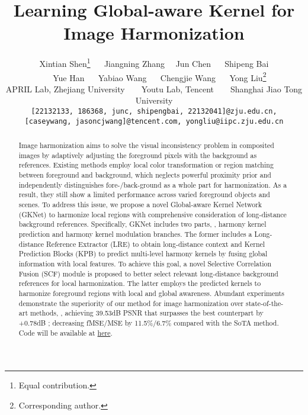 \documentclass[10pt,twocolumn,letterpaper]{article}
\begin{document}
\title{Learning Global-aware Kernel for Image Harmonization}
\author{Xintian Shen\thanks{Equal contribution.}
~ ~Jiangning Zhang\footnotemark[1]
~ ~Jun Chen
~ ~Shipeng Bai \\
~ ~Yue Han
~ ~Yabiao Wang
~ ~Chengjie Wang
~ ~Yong Liu\thanks{Corresponding author.} \\
\normalsize  APRIL Lab, Zhejiang University ~ ~ Youtu Lab, Tencent ~ ~ Shanghai Jiao Tong University \\
{\tt\small [22132133, 186368, junc, shipengbai, 
22132041]@zju.edu.cn,} \\
{\tt\small[caseywang, jasoncjwang]@tencent.com, yongliu@iipc.zju.edu.cn}
}


\maketitle
\ificcvfinal\thispagestyle{empty}\fi


\begin{abstract}

Image harmonization aims to solve the visual inconsistency problem in composited images by adaptively adjusting the foreground pixels with the background as references. Existing methods employ local color transformation or region matching between foreground and background, which neglects powerful proximity prior and independently distinguishes fore-/back-ground as a whole part for harmonization. As a result, they still show a limited performance across varied foreground objects and scenes. To address this issue, we propose a novel Global-aware Kernel Network (GKNet) to harmonize local regions with comprehensive consideration of long-distance background references.
Specifically, GKNet includes two parts, \ie, harmony kernel prediction and harmony kernel modulation branches. The former includes a Long-distance Reference Extractor (LRE) to obtain long-distance context and Kernel Prediction Blocks (KPB) to predict multi-level harmony kernels by fusing global information with local features. To achieve this goal, a novel Selective Correlation Fusion (SCF) module is proposed to better select relevant long-distance background references for local harmonization. The latter employs the predicted kernels to harmonize foreground regions with local and global awareness. Abundant experiments demonstrate the superiority of our method for image harmonization over state-of-the-art methods, \eg, achieving 39.53dB PSNR that surpasses the best counterpart by +0.78dB ; decreasing fMSE/MSE by 11.5\%/6.7\% compared with the SoTA method. Code will be available at \href{https://github.com/XintianShen/GKNet}{here}.

\end{abstract}
\end{document}
